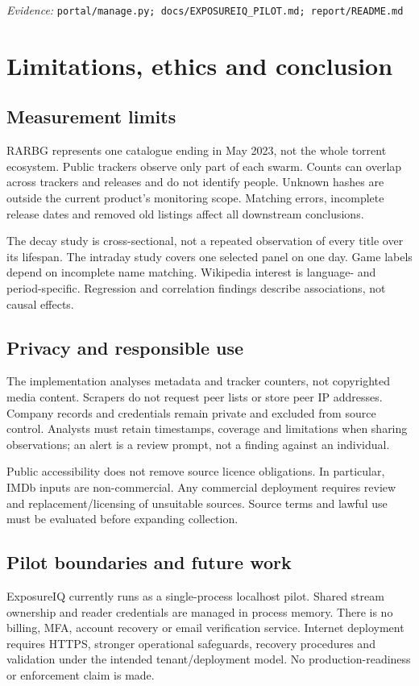 \documentclass[11pt,a4paper]{article}
\newcommand{\code}[1]{{\small\nolinkurl{#1}}}
\newcommand{\source}[1]{{\footnotesize\textit{Evidence:} \code{#1}\par}}
\newcommand{\chapterpage}[1]{\clearpage\section{#1}}
\begin{document}
\source{portal/manage.py; docs/EXPOSUREIQ_PILOT.md; report/README.md}

\chapterpage{Limitations, ethics and conclusion}
\subsection{Measurement limits}
RARBG represents one catalogue ending in May 2023, not the whole torrent
ecosystem. Public trackers observe only part of each swarm. Counts can
overlap across trackers and releases and do not identify people.
Unknown hashes are outside the current product's monitoring scope.
Matching errors, incomplete release dates and removed old listings affect
all downstream conclusions.

The decay study is cross-sectional, not a repeated observation of every
title over its lifespan. The intraday study covers one selected panel on
one day. Game labels depend on incomplete name matching. Wikipedia interest
is language- and period-specific. Regression and correlation findings
describe associations, not causal effects.

\subsection{Privacy and responsible use}
The implementation analyses metadata and tracker counters, not copyrighted
media content. Scrapers do not request peer lists or store peer IP
addresses. Company records and credentials remain private and excluded
from source control. Analysts must retain timestamps, coverage and
limitations when sharing observations; an alert is a review prompt,
not a finding against an individual.

Public accessibility does not remove source licence obligations. In
particular, IMDb inputs are non-commercial. Any commercial deployment
requires review and replacement/licensing of unsuitable sources.
Source terms and lawful use must be evaluated before expanding collection.

\subsection{Pilot boundaries and future work}
ExposureIQ currently runs as a single-process localhost pilot. Shared
stream ownership and reader credentials are managed in process memory.
There is no billing, MFA, account recovery or email verification service.
Internet deployment requires HTTPS, stronger operational safeguards,
recovery procedures and validation under the intended tenant/deployment
model. No production-readiness or enforcement claim is made.
\end{document}
